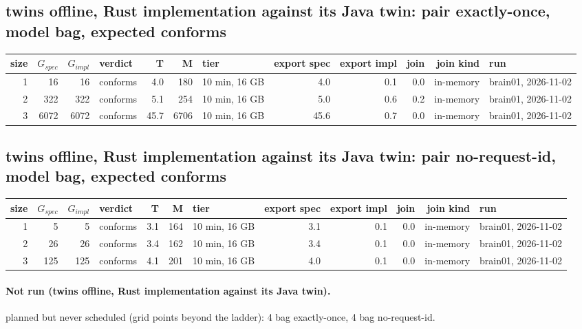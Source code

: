 \documentclass[10pt]{article}
\begin{document}
\subsection*{twins offline, Rust implementation against its Java twin: pair \textsf{exactly-once}, model bag, expected conforms}
\begin{longtable}{@{}rrrlrrlrrrrl@{}}
\toprule
size & $G_{\mathit{spec}}$ & $G_{\mathit{impl}}$ & verdict & T & M & tier & export spec & export impl & join & join kind & run \\
\midrule
\endhead
\color{red} 1 & 16 & 16 & conforms & 4.0 & 180 & 10 min, 16 GB & 4.0 & 0.1 & 0.0 & in-memory & brain01, 2026-11-02 \\
\color{red} 2 & 322 & 322 & conforms & 5.1 & 254 & 10 min, 16 GB & 5.0 & 0.6 & 0.2 & in-memory & brain01, 2026-11-02 \\
\color{red} 3 & 6072 & 6072 & conforms & 45.7 & 6706 & 10 min, 16 GB & 45.6 & 0.7 & 0.0 & in-memory & brain01, 2026-11-02 \\
\bottomrule
\end{longtable}
\subsection*{twins offline, Rust implementation against its Java twin: pair \textsf{no-request-id}, model bag, expected conforms}
\begin{longtable}{@{}rrrlrrlrrrrl@{}}
\toprule
size & $G_{\mathit{spec}}$ & $G_{\mathit{impl}}$ & verdict & T & M & tier & export spec & export impl & join & join kind & run \\
\midrule
\endhead
\color{red} 1 & 5 & 5 & conforms & 3.1 & 164 & 10 min, 16 GB & 3.1 & 0.1 & 0.0 & in-memory & brain01, 2026-11-02 \\
\color{red} 2 & 26 & 26 & conforms & 3.4 & 162 & 10 min, 16 GB & 3.4 & 0.1 & 0.0 & in-memory & brain01, 2026-11-02 \\
\color{red} 3 & 125 & 125 & conforms & 4.1 & 201 & 10 min, 16 GB & 4.0 & 0.1 & 0.0 & in-memory & brain01, 2026-11-02 \\
\bottomrule
\end{longtable}
\paragraph{Not run (twins offline, Rust implementation against its Java twin).}
planned but never scheduled (grid points beyond the ladder): 4 bag exactly-once, 4 bag no-request-id.\par
\end{document}
